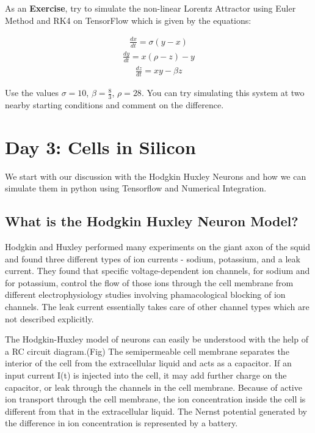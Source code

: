 \documentclass[10pt,letterpaper]{article}
\begin{document}
As an \textbf{Exercise}, try to simulate the non-linear Lorentz Attractor using Euler Method and RK4 on TensorFlow which is given by the equations:

\begin{eqnarray}\frac{dx}{dt}=\sigma(y-x) \end{eqnarray}
\begin{eqnarray}\frac{dy}{dt}=x(\rho-z)-y \end{eqnarray}
\begin{eqnarray}\frac{dz}{dt}=xy-\beta z \end{eqnarray}

Use the values $\sigma =10$, $\beta =\frac{8}{3}$, $\rho =28$. You can try simulating this system at two nearby starting conditions and comment on the difference.

\section*{Day 3: Cells in Silicon}

We start with our discussion with the Hodgkin Huxley Neurons and how we can simulate them in python using Tensorflow and Numerical Integration.

\subsection*{What is the Hodgkin Huxley Neuron Model?}

Hodgkin and Huxley performed many experiments on the giant axon of the squid and found three different types of ion currents - sodium, potassium, and a leak current. They found that specific voltage-dependent ion channels, for sodium and for potassium, control the flow of those ions through the cell membrane from different electrophysiology studies involving phamacological blocking of ion channels. The leak current essentially takes care of other channel types which are not described explicitly. 

The Hodgkin-Huxley model of neurons can easily be understood with the help of a RC circuit diagram.(Fig) The semipermeable cell membrane separates the interior of the cell from the extracellular liquid and acts as a capacitor. If an input current I(t) is injected into the cell, it may add further charge on the capacitor, or leak through the channels in the cell membrane. Because of active ion transport through the cell membrane, the ion concentration inside the cell is different from that in the extracellular liquid. The Nernst potential generated by the difference in ion concentration is represented by a battery.
\end{document}
